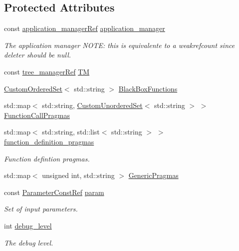 \subsection*{Protected Attributes}
\begin{DoxyCompactItemize}
\item 
const \hyperlink{application__manager_8hpp_a04ccad4e5ee401e8934306672082c180}{application\+\_\+manager\+Ref} \hyperlink{classpragma__manager_ad94113f0d7d54790b0b0be2be6eba8da}{application\+\_\+manager}
\begin{DoxyCompactList}\small\item\em The application manager N\+O\+TE\+: this is equivalente to a weakrefcount since deleter should be null. \end{DoxyCompactList}\item 
const \hyperlink{tree__manager_8hpp_a96ff150c071ce11a9a7a1e40590f205e}{tree\+\_\+manager\+Ref} \hyperlink{classpragma__manager_a9109662b40c1a68d1b9755a5170f1a01}{TM}
\item 
\hyperlink{classCustomOrderedSet}{Custom\+Ordered\+Set}$<$ std\+::string $>$ \hyperlink{classpragma__manager_aeae9103176fef8fee3a63b81cfec4342}{Black\+Box\+Functions}
\item 
std\+::map$<$ std\+::string, \hyperlink{classCustomUnorderedSet}{Custom\+Unordered\+Set}$<$ std\+::string $>$ $>$ \hyperlink{classpragma__manager_ab00b1457c9061fdc6de3e91edc4a5269}{Function\+Call\+Pragmas}
\item 
std\+::map$<$ std\+::string, std\+::list$<$ std\+::string $>$ $>$ \hyperlink{classpragma__manager_a4c03019c24eb4b9a588be390749d8d69}{function\+\_\+definition\+\_\+pragmas}
\begin{DoxyCompactList}\small\item\em Function defintion pragmas. \end{DoxyCompactList}\item 
std\+::map$<$ unsigned int, std\+::string $>$ \hyperlink{classpragma__manager_a1b280c103e7b315759406114d67760d1}{Generic\+Pragmas}
\item 
const \hyperlink{Parameter_8hpp_a37841774a6fcb479b597fdf8955eb4ea}{Parameter\+Const\+Ref} \hyperlink{classpragma__manager_ae835ae679a5824acb0d3462dccbdc9f3}{param}
\begin{DoxyCompactList}\small\item\em Set of input parameters. \end{DoxyCompactList}\item 
int \hyperlink{classpragma__manager_af085dbf522ddedf4915997f9a70af0c2}{debug\+\_\+level}
\begin{DoxyCompactList}\small\item\em The debug level. \end{DoxyCompactList}\end{DoxyCompactItemize}


